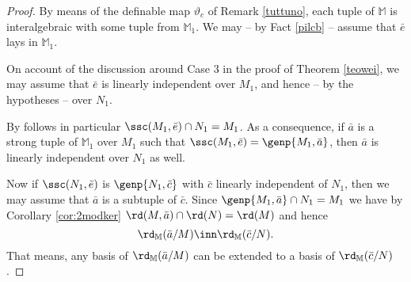 \begin{proof}
By means of the definable map $\vartheta_{c}$ of Remark \ref{tuttuno}, each tuple of $\mathbb{M}$ is interalgebraic
with some tuple from $\mathbb{M}_{1}$. We may -- by Fact \ref{pilcb} -- assume that $\bar e$ lays in $\mathbb{M}_{1}$.
%
% 
%
 
On account of the discussion around Case 3 in the proof of Theorem \ref{teowei}, we may assume that
$\bar e$ is linearly independent over $M_{1}$, and hence -- by the hypotheses -- over $N_{1}$.

\smallskip
By  follows in particular $\ssc(M_{1},\bar e)\cap N_{1}=M_{1}$.
As a consequence, if $\bar a$ is
a strong tuple of $\mathbb{M}_{1}$ over $M_{1}$ such that $\ssc(M_{1},\bar e)=\genp{M_{1},\bar a}$,
then $\bar a$ is linearly independent over $N_{1}$ as well.

Now if $\ssc(N_{1},\bar e)$ is $\genp{N_{1},\bar c}$ with $\bar c$ linearly independent of $N_{1}$,
then we may assume that $\bar a$ is a subtuple of $\bar c$. Since $\genp{M_{1},\bar a}\cap N_{1}=M_{1}$ we have
by Corollary \ref{cor:2modker} $\rd(M,\bar a)\cap\rd(N)=\rd(M)$ and hence
$$\rd_{\mathbb{M}}(\bar a/M)\inn\rd_{\mathbb{M}}(\bar c/N).$$
That means, any basis of $\rd_{\mathbb{M}}(\bar a/M)$ can be extended to a basis of $\rd_{\mathbb{M}}(\bar c/N)$.


\end{proof}
